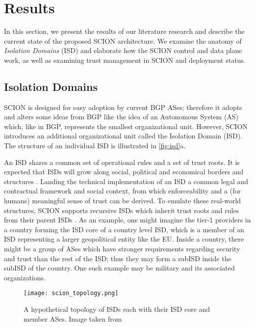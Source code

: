 \documentclass[../eva1_scion.tex]{subfiles}
\begin{document}
    
\section{Results} \label{sec:results}
    In this section, we present the results of our literature research and describe the current state of the proposed SCION architecture. We examine the anatomy of \textit{Isolation Domains} (ISD) and elaborate how the SCION control and data plane work, as well as examining trust management in SCION and deployment status.

    \subsection{Isolation Domains} \label{ssec:isd}
    SCION is designed for easy adoption by current BGP ASes; therefore it adopts and alters some ideas from BGP like the idea of an Autonomous System (AS) which, like in BGP, represents the smallest organizational unit. However, SCION introduces an additional organizational unit called the Isolation Domain (ISD). The structure of an individual ISD is illustrated in \ref{fig:isd}a. 

            An ISD shares a common set of operational rules and a set of trust roots. It is expected that ISDs will grow along social, political and economical borders and structures \cite{scion_2011}. Landing the technical implementation of an ISD a common legal and contractual framework and social context, from which enforceability and a (for humans) meaningful sense of trust can be derived. To emulate these real-world structures, SCION supports recursive ISDs  which inherit trust roots and rules from their parent ISDs \cite{scion_2011}. As an example, one might imagine the tier-1 providers in a country forming the ISD core of a country level ISD, which is a member of an ISD representing a larger geopolitical entity like the EU. Inside a country, there might be a group of ASes which have stronger requirements regarding security and trust than the rest of the ISD; thus they may form a subISD inside the subISD of the country. One such example may be military and its associated organizations.

    \begin{figure}[ht]
        \centering
        \texttt{[image: scion\_topology.png]}
        \caption{A hypothetical topology of ISDs each with their ISD core and member ASes. Image taken from \cite{scion_2015}}%
        \label{fig:isd_topology}
    \end{figure}
\end{document}
